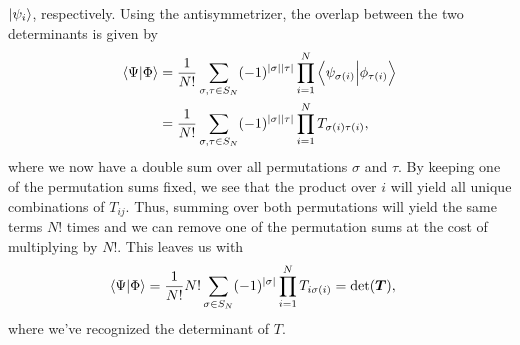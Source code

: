             $\ket{\psi_i}$, respectively.
            Using the antisymmetrizer, the overlap between the two determinants
            is given by
            \begin{align}
                \braket{\Psi}{\Phi}
                &=
                \frac{1}{N!}
                \sum_{\sigma, \tau \in S_N}
                (-1)^{\abs{\sigma}\abs{\tau}}
                \prod_{i = 1}^{N}
                \braket{\psi_{\sigma(i)}}{\phi_{\tau(i)}}
                \\
                &=
                \frac{1}{N!}
                \sum_{\sigma, \tau \in S_N}
                (-1)^{\abs{\sigma}\abs{\tau}}
                \prod_{i = 1}^{N}
                T_{\sigma(i)\tau(i)},
            \end{align}
            where we now have a double sum over all permutations $\sigma$ and
            $\tau$.
            By keeping one of the permutation sums fixed, we see that the
            product over $i$ will yield all unique combinations of $T_{ij}$.
            Thus, summing over both permutations will yield the same terms $N!$
            times and we can remove one of the permutation sums at the cost of
            multiplying by $N!$.
            This leaves us with
            \begin{align}
                \braket{\Psi}{\Phi}
                &=
                \frac{1}{N!} N!
                \sum_{\sigma \in S_N}
                (-1)^{\abs{\sigma}}
                \prod_{i = 1}^{N}
                T_{i\sigma(i)}
                =
                \det(\boldsymbol{T}),
            \end{align}
            where we've recognized the determinant of $T$.


